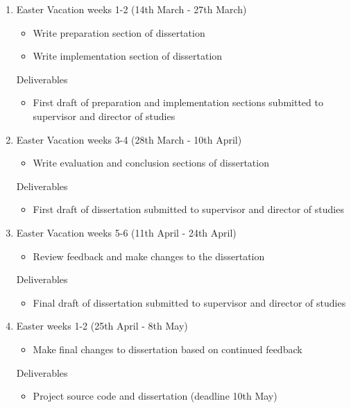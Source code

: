 \documentclass[12pt,a4paper]{article}
\begin{document}
\begin{enumerate}
    \item Easter Vacation weeks 1-2 (14th March - 27th March)
    \begin{itemize}
        \item Write preparation section of dissertation
        \item Write implementation section of dissertation
    \end{itemize}
    Deliverables
    \begin{itemize}
        \item First draft of preparation and implementation sections submitted to supervisor and director of studies
    \end{itemize}

    \item Easter Vacation weeks 3-4 (28th March - 10th April)
    \begin{itemize}
        \item Write evaluation and conclusion sections of dissertation
    \end{itemize}
    Deliverables
    \begin{itemize}
        \item First draft of dissertation submitted to supervisor and director of studies
    \end{itemize}

    \item Easter Vacation weeks 5-6 (11th April - 24th April)
    \begin{itemize}
        \item Review feedback and make changes to the dissertation 
    \end{itemize}
    Deliverables
    \begin{itemize}
        \item Final draft of dissertation submitted to supervisor and director of studies
    \end{itemize}

    \item Easter weeks 1-2 (25th April - 8th May)
    \begin{itemize}
        \item Make final changes to dissertation based on continued feedback
    \end{itemize}
    Deliverables
    \begin{itemize}
        \item Project source code and dissertation (deadline 10th May)
    \end{itemize}

\end{enumerate}
\end{document}
